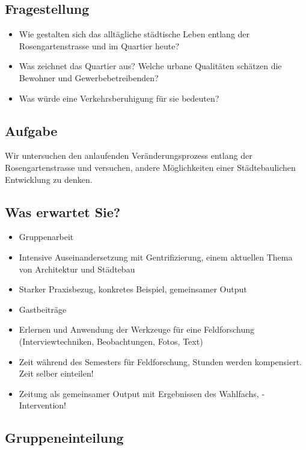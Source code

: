 \documentclass[a4paper,11pt,ngerman]{scrartcl}
\begin{document}
\subsection{Fragestellung}
\label{sec-1-2}

\begin{itemize}
\item Wie gestalten sich das alltägliche städtische Leben entlang der
Rosengartenstrasse und im Quartier heute?
\item Was zeichnet das Quartier aus? Welche urbane Qualitäten schätzen die
Bewohner und Gewerbebetreibenden?
\item Was würde eine Verkehrsberuhigung für sie bedeuten?
\end{itemize}

\subsection{Aufgabe}
\label{sec-1-3}

Wir untersuchen den anlaufenden Veränderungsprozess entlang der
Rosengartenstrasse und versuchen, andere Möglichkeiten einer Städtebaulichen
Entwicklung zu denken.

\subsection{Was erwartet Sie?}
\label{sec-1-4}

\begin{itemize}
\item Gruppenarbeit
\item Intensive Auseinandersetzung mit Gentrifizierung, einem aktuellen Thema von
Architektur und Städtebau
\item Starker Praxisbezug, konkretes Beispiel, gemeinsamer Output
\item Gastbeiträge
\item Erlernen und Anwendung der Werkzeuge für eine Feldforschung
(Interviewtechniken, Beobachtungen, Fotos, Text)
\item Zeit während des Semesters für Feldforschung, Stunden werden
kompensiert. Zeit selber einteilen!
\item Zeitung als gemeinsamer Output mit Ergebnissen des Wahlfachs, -
Intervention!
\end{itemize}

\subsection{Gruppeneinteilung}
\label{sec-1-5}
\end{document}
